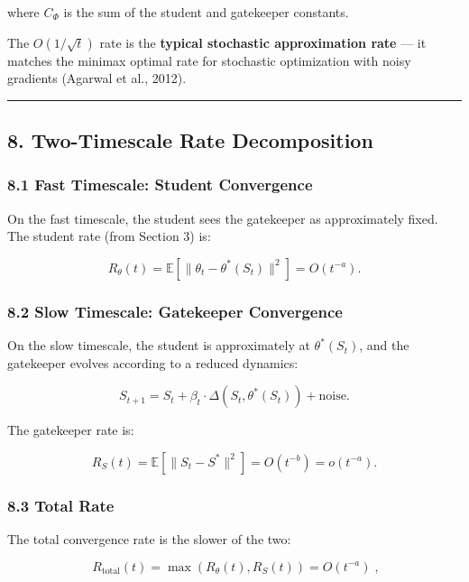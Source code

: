 \documentclass[
  12pt,
]{ctexart}
\begin{document}
where \(C_\Phi\) is the sum of the student and gatekeeper constants.

The \(O(1/\sqrt{t})\) rate is the \textbf{typical stochastic
approximation rate} --- it matches the minimax optimal rate for
stochastic optimization with noisy gradients (Agarwal et al., 2012).

\begin{center}\rule{0.5\linewidth}{0.5pt}\end{center}

\subsection{8. Two-Timescale Rate
Decomposition}\label{two-timescale-rate-decomposition}

\subsubsection{8.1 Fast Timescale: Student
Convergence}\label{fast-timescale-student-convergence}

On the fast timescale, the student sees the gatekeeper as approximately
fixed. The student rate (from Section 3) is:

\[R_\theta(t) = \mathbb{E}[\|\theta_t - \theta^*(S_t)\|^2] = O(t^{-a}).\]

\subsubsection{8.2 Slow Timescale: Gatekeeper
Convergence}\label{slow-timescale-gatekeeper-convergence}

On the slow timescale, the student is approximately at
\(\theta^*(S_t)\), and the gatekeeper evolves according to a reduced
dynamics:

\[S_{t+1} = S_t + \beta_t \cdot \Delta(S_t, \theta^*(S_t)) + \text{noise}.\]

The gatekeeper rate is:

\[R_S(t) = \mathbb{E}[\|S_t - S^*\|^2] = O(t^{-b}) = o(t^{-a}).\]

\subsubsection{8.3 Total Rate}\label{total-rate}

The total convergence rate is the slower of the two:

\[\boxed{\;R_{\text{total}}(t) = \max(R_\theta(t), R_S(t)) = O(t^{-a})\;},\]
\end{document}
